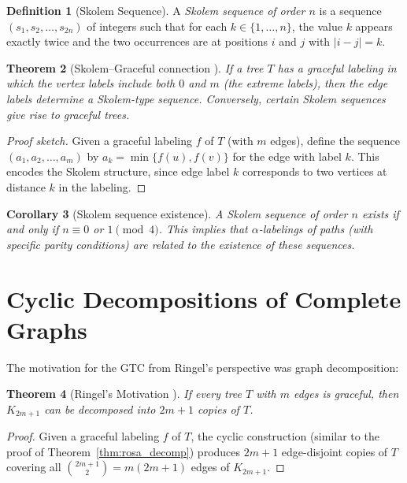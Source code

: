\documentclass[12pt,a4paper]{amsart}
\newtheorem{theorem}{Theorem}[section]
\newtheorem{corollary}[theorem]{Corollary}
\theoremstyle{definition}
\newtheorem{definition}[theorem]{Definition}
\theoremstyle{remark}
\begin{document}
\begin{definition}[Skolem Sequence]
A \emph{Skolem sequence of order $n$} is a sequence $(s_1, s_2, \ldots, s_{2n})$
of integers such that for each $k \in \{1, \ldots, n\}$, the value $k$ appears
exactly twice and the two occurrences are at positions $i$ and $j$ with $|i-j| = k$.
\end{definition}

\begin{theorem}[Skolem--Graceful connection \cite{Abrham1991}]\label{thm:skolem_graceful}
If a tree $T$ has a graceful labeling in which the vertex labels include both $0$
and $m$ (the extreme labels), then the edge labels determine a Skolem-type sequence.
Conversely, certain Skolem sequences give rise to graceful trees.
\end{theorem}

\begin{proof}[Proof sketch]
Given a graceful labeling $f$ of $T$ (with $m$ edges), define the sequence
$(a_1, a_2, \ldots, a_m)$ by $a_k = \min\{f(u), f(v)\}$ for the edge with
label $k$. This encodes the Skolem structure, since edge label $k$ corresponds
to two vertices at distance $k$ in the labeling.
\end{proof}

\begin{corollary}[Skolem sequence existence]\label{cor:skolem_exist}
A Skolem sequence of order $n$ exists if and only if $n \equiv 0$ or $1 \pmod 4$.
This implies that $\alpha$-labelings of paths (with specific parity conditions)
are related to the existence of these sequences.
\end{corollary}

\section{Cyclic Decompositions of Complete Graphs}\label{sec:cyclic}

The motivation for the GTC from Ringel's perspective was graph decomposition:

\begin{theorem}[Ringel's Motivation \cite{RingelKotzig1964}]\label{thm:ringel}
If every tree $T$ with $m$ edges is graceful, then $K_{2m+1}$ can be
decomposed into $2m+1$ copies of $T$.
\end{theorem}

\begin{proof}
Given a graceful labeling $f$ of $T$, the cyclic construction (similar to the proof
of Theorem~\ref{thm:rosa_decomp}) produces $2m+1$ edge-disjoint copies of $T$ covering
all $\binom{2m+1}{2} = m(2m+1)$ edges of $K_{2m+1}$.
\end{proof}
\end{document}
